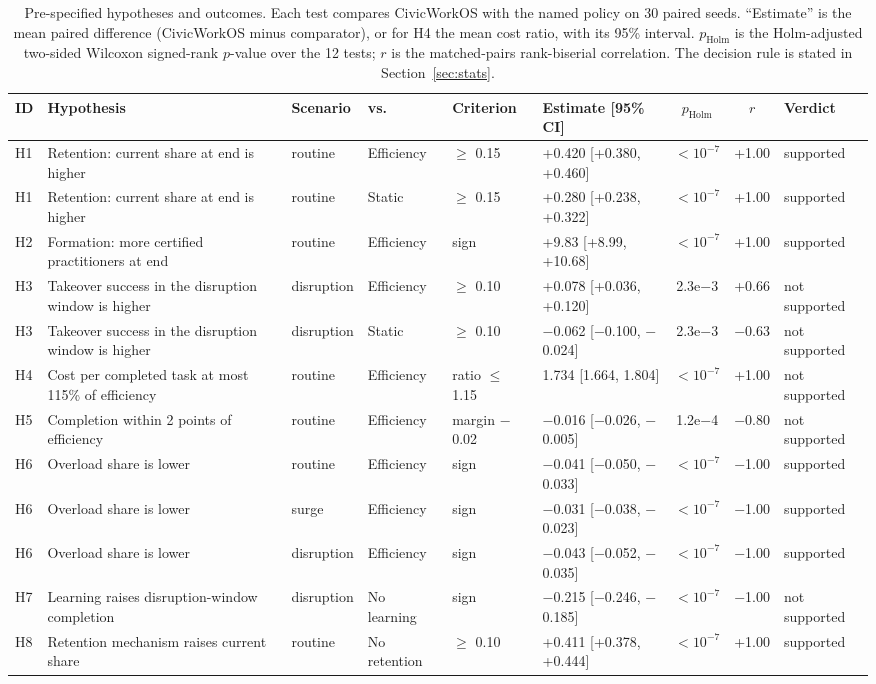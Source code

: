 \documentclass[utf8]{FrontiersinHarvard}
\begin{document}
	\begin{table}[!htbp]
		\caption{Pre-specified hypotheses and outcomes. Each test compares CivicWorkOS with the named policy on 30 paired seeds. ``Estimate'' is the mean paired difference (CivicWorkOS minus comparator), or for H4 the mean cost ratio, with its 95\% interval. $p_{\text{Holm}}$ is the Holm-adjusted two-sided Wilcoxon signed-rank $p$-value over the 12 tests; $r$ is the matched-pairs rank-biserial correlation. The decision rule is stated in Section~\ref{sec:stats}.}
		\label{tab:hypotheses}
		\scriptsize
		\setlength{\tabcolsep}{1.8pt}
		\begin{tabularx}{\textwidth}{@{}lXllllccl@{}}
			\toprule
			\textbf{ID} & \textbf{Hypothesis} & \textbf{Scenario} & \textbf{vs.} & \textbf{Criterion} & \textbf{Estimate [95\% CI]} & \textbf{$p_{\text{Holm}}$} & \textbf{$r$} & \textbf{Verdict}\\
			\midrule
H1 & Retention: current share at end is higher & routine & Efficiency & $\ge$ 0.15 & +0.420 [+0.380, +0.460] & $<10^{-7}$ & +1.00 & supported\\
H1 & Retention: current share at end is higher & routine & Static & $\ge$ 0.15 & +0.280 [+0.238, +0.322] & $<10^{-7}$ & +1.00 & supported\\
H2 & Formation: more certified practitioners at end & routine & Efficiency & sign & +9.83 [+8.99, +10.68] & $<10^{-7}$ & +1.00 & supported\\
H3 & Takeover success in the disruption window is higher & disruption & Efficiency & $\ge$ 0.10 & +0.078 [+0.036, +0.120] & 2.3e$-$3 & +0.66 & not supported\\
H3 & Takeover success in the disruption window is higher & disruption & Static & $\ge$ 0.10 & $-$0.062 [$-$0.100, $-$0.024] & 2.3e$-$3 & $-$0.63 & not supported\\
H4 & Cost per completed task at most 115\% of efficiency & routine & Efficiency & ratio $\le$ 1.15 & 1.734 [1.664, 1.804] & $<10^{-7}$ & +1.00 & not supported\\
H5 & Completion within 2 points of efficiency & routine & Efficiency & margin $-$0.02 & $-$0.016 [$-$0.026, $-$0.005] & 1.2e$-$4 & $-$0.80 & not supported\\
H6 & Overload share is lower & routine & Efficiency & sign & $-$0.041 [$-$0.050, $-$0.033] & $<10^{-7}$ & $-$1.00 & supported\\
H6 & Overload share is lower & surge & Efficiency & sign & $-$0.031 [$-$0.038, $-$0.023] & $<10^{-7}$ & $-$1.00 & supported\\
H6 & Overload share is lower & disruption & Efficiency & sign & $-$0.043 [$-$0.052, $-$0.035] & $<10^{-7}$ & $-$1.00 & supported\\
H7 & Learning raises disruption-window completion & disruption & No learning & sign & $-$0.215 [$-$0.246, $-$0.185] & $<10^{-7}$ & $-$1.00 & not supported\\
H8 & Retention mechanism raises current share & routine & No retention & $\ge$ 0.10 & +0.411 [+0.378, +0.444] & $<10^{-7}$ & +1.00 & supported\\
			\bottomrule
		\end{tabularx}
	\end{table}
\end{document}

